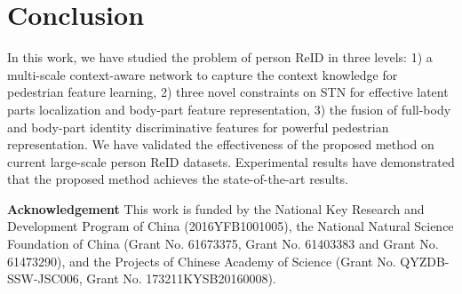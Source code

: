 \documentclass[10pt,twocolumn,letterpaper]{article}
\begin{document}
\section{Conclusion}
\label{conclusions}

In this work, we have studied the problem of person ReID in three levels:
1) a multi-scale context-aware network to capture the context knowledge for pedestrian feature learning,
2) three novel constraints on STN for effective latent parts localization and body-part feature representation,
3) the fusion of full-body and body-part identity discriminative features for powerful pedestrian representation.
We have validated the effectiveness of the proposed method on current large-scale person ReID datasets.
Experimental results have demonstrated that the proposed method achieves the state-of-the-art results.

\textbf{Acknowledgement} This work is funded by the National Key Research and Development Program of China (2016YFB1001005), the National Natural Science Foundation of China (Grant No. 61673375, Grant No. 61403383 and Grant No. 61473290), and the Projects of Chinese Academy of Science (Grant No. QYZDB-SSW-JSC006, Grant No. 173211KYSB20160008).

{\small


}
\end{document}
